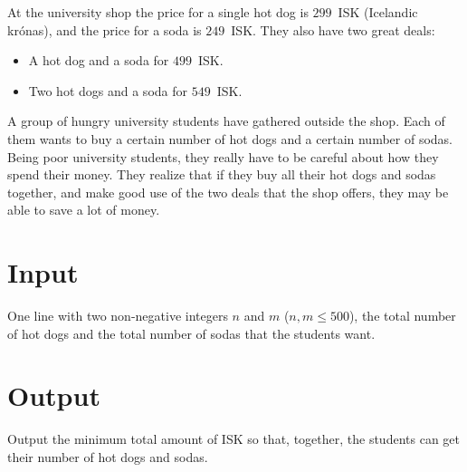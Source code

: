 
At the university shop the price for a single hot dog is $299$~ISK (Icelandic
krónas), and the price for a soda is $249$~ISK. They also have two great deals:
\begin{itemize}
    \item A hot dog and a soda for $499$~ISK.
    \item Two hot dogs and a soda for $549$~ISK.
\end{itemize}

A group of hungry university students have gathered outside the shop. Each of
them wants to buy a certain number of hot dogs and a certain number of sodas.
Being poor university students, they really have to be careful about how they
spend their money. They realize that if they buy all their hot dogs and sodas
together, and make good use of the two deals that the shop offers, they may be
able to save a lot of money.

\section*{Input}
One line with two non-negative integers $n$ and $m$ ($n,m \le 500$), the total
number of hot dogs and the total number of sodas that the students want.

\section*{Output}
Output the minimum total amount of ISK so that, together, the students can get
their number of hot dogs and sodas.

